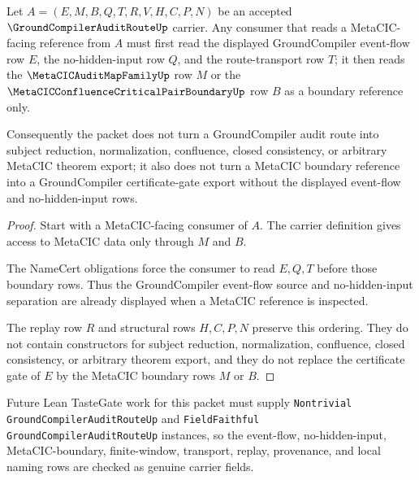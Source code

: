 \begin{theorem}
\label{thm:groundcompiler-audit-route-metacic-boundary}
Let $A=(E,M,B,Q,T,R,V,H,C,P,N)$ be an accepted $\GroundCompilerAuditRouteUp$ carrier. Any consumer that reads a MetaCIC-facing reference from $A$ must first read the displayed GroundCompiler event-flow row $E$, the no-hidden-input row $Q$, and the route-transport row $T$; it then reads the $\MetaCICAuditMapFamilyUp$ row $M$ or the $\MetaCICConfluenceCriticalPairBoundaryUp$ row $B$ as a boundary reference only.

Consequently the packet does not turn a GroundCompiler audit route into subject reduction, normalization, confluence, closed consistency, or arbitrary MetaCIC theorem export; it also does not turn a MetaCIC boundary reference into a GroundCompiler certificate-gate export without the displayed event-flow and no-hidden-input rows.
\end{theorem}
\begin{proof}
Start with a MetaCIC-facing consumer of $A$. The carrier definition gives access to MetaCIC data only through $M$ and $B$.

The NameCert obligations force the consumer to read $E,Q,T$ before those boundary rows. Thus the GroundCompiler event-flow source and no-hidden-input separation are already displayed when a MetaCIC reference is inspected.

The replay row $R$ and structural rows $H,C,P,N$ preserve this ordering. They do not contain constructors for subject reduction, normalization, confluence, closed consistency, or arbitrary theorem export, and they do not replace the certificate gate of $E$ by the MetaCIC boundary rows $M$ or $B$.
\end{proof}

Future Lean TasteGate work for this packet must supply \texttt{Nontrivial GroundCompilerAuditRouteUp} and \texttt{FieldFaithful GroundCompilerAuditRouteUp} instances, so the event-flow, no-hidden-input, MetaCIC-boundary, finite-window, transport, replay, provenance, and local naming rows are checked as genuine carrier fields.


